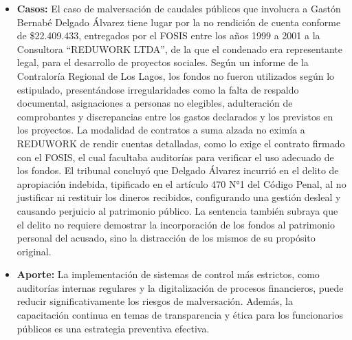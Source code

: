 \documentclass[letter,12pt]{article}
\begin{document}
\begin{itemize}
		\item \textbf{Casos: }El caso de malversación de caudales públicos que involucra a Gastón Bernabé Delgado Álvarez tiene lugar por la no rendición de cuenta conforme de \$22.409.433, entregados por el FOSIS entre los años 1999 a 2001 a la Consultora “REDUWORK LTDA”, de la que el condenado era representante legal, para el desarrollo de proyectos sociales. Según un informe de la Contraloría Regional de Los Lagos, los fondos no fueron utilizados según lo estipulado, presentándose irregularidades como la falta de respaldo documental, asignaciones a personas no elegibles, adulteración de comprobantes y discrepancias entre los gastos declarados y los previstos en los proyectos. La modalidad de contratos a suma alzada no eximía a REDUWORK de rendir cuentas detalladas, como lo exige el contrato firmado con el FOSIS, el cual facultaba auditorías para verificar el uso adecuado de los fondos. El tribunal concluyó que Delgado Álvarez incurrió en el delito de apropiación indebida, tipificado en el artículo 470 N°1 del Código Penal, al no justificar ni restituir los dineros recibidos, configurando una gestión desleal y causando perjuicio al patrimonio público. La sentencia también subraya que el delito no requiere demostrar la incorporación de los fondos al patrimonio personal del acusado, sino la distracción de los mismos de su propósito original.\\
		
		\item \textbf{Aporte: }La implementación de sistemas de control más estrictos, como auditorías internas regulares y la digitalización de procesos financieros, puede reducir significativamente los riesgos de malversación. Además, la capacitación continua en temas de transparencia y ética para los funcionarios públicos es una estrategia preventiva efectiva.\\
	\end{itemize}
	
\end{document}
